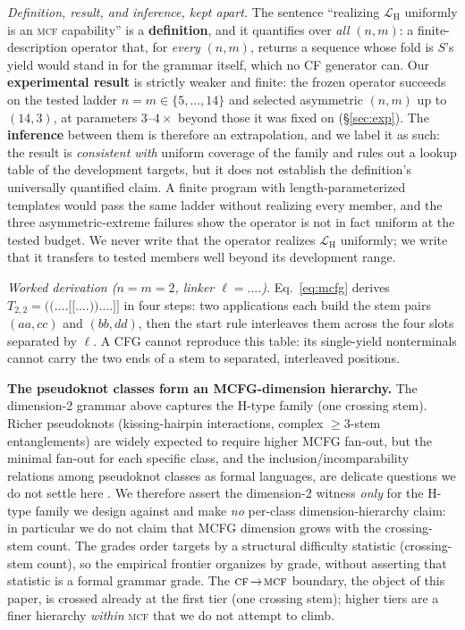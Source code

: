 \documentclass[11pt]{article}
\newcommand{\CF}{\textsc{cf}}
\newcommand{\MCF}{\textsc{mcf}}
\begin{document}
\smallskip\noindent\emph{Definition, result, and inference, kept apart.} The sentence ``realizing
$\mathcal L_{\mathrm H}$ uniformly is an \MCF{} capability'' is a \textbf{definition}, and it quantifies over
\emph{all} $(n,m)$: a finite-description operator that, for \emph{every} $(n,m)$, returns a sequence whose fold
is $S$'s yield would stand in for the grammar itself, which no CF generator can. Our \textbf{experimental
result} is strictly weaker and finite: the frozen operator succeeds on the tested ladder
$n{=}m\in\{5,\dots,14\}$ and selected asymmetric $(n,m)$ up to $(14,3)$, at parameters $3$--$4\times$ beyond
those it was fixed on (\S\ref{sec:exp}). The \textbf{inference} between them is therefore an extrapolation, and
we label it as such: the result is \emph{consistent with} uniform coverage of the family and rules out a
lookup table of the development targets, but it does not establish the definition's universally quantified
claim. A finite program with length-parameterized templates would pass the same ladder without realizing every
member, and the three asymmetric-extreme failures show the operator is not in fact uniform at the tested
budget. We never write that the operator realizes $\mathcal L_{\mathrm H}$ uniformly; we write that it
transfers to tested members well beyond its development range.

\smallskip\noindent\emph{Worked derivation ($n{=}m{=}2$, linker $\ell{=}\texttt{....}$).} Eq.~\eqref{eq:mcfg}
derives $T_{2,2}=\texttt{((....[[....))....]]}$ in four steps: two applications each
build the stem pairs $(aa,cc)$ and $(bb,dd)$, then the start rule interleaves them across the four slots
separated by $\ell$. A CFG cannot reproduce this table: its single-yield nonterminals cannot carry the two
ends of a stem to separated, interleaved positions.

\smallskip\noindent\textbf{The pseudoknot classes form an MCFG-dimension hierarchy.} The dimension-2 grammar
above captures the H-type family (one crossing stem). Richer pseudoknots (kissing-hairpin interactions,
complex $\ge3$-stem entanglements) are widely expected to require higher MCFG fan-out, but the minimal fan-out
for each specific class, and the inclusion/incomparability relations among pseudoknot classes as formal
languages, are delicate questions we do not settle here \citep{rivaseddy2000,nebelweinberg,katosekikasami2006}.
We therefore assert the dimension-2 witness \emph{only} for the H-type family we design against and make
\emph{no} per-class dimension-hierarchy claim: in particular we do not claim that MCFG dimension grows with
the crossing-stem count. The grades order targets by a structural difficulty statistic (crossing-stem count), so the empirical frontier organizes by grade, without
asserting that statistic is a formal grammar grade. The $\CF\!\to\!\MCF$ boundary, the object of this
paper, is crossed already at the first tier (one crossing stem); higher tiers are a finer hierarchy
\emph{within} \MCF{} that we do not attempt to climb.
\end{document}
